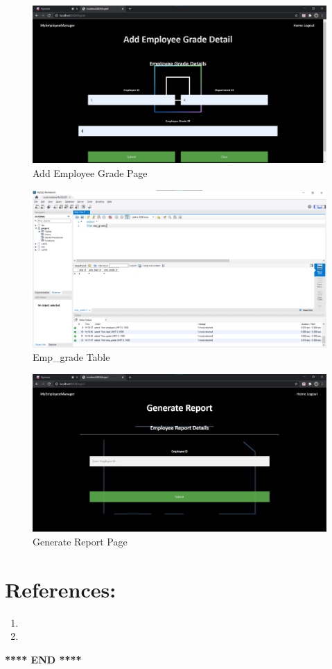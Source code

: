 \documentclass[12pt]{article}
\begin{document}
\begin{figure}
    \centering
    \includegraphics[width = \columnwidth]{screenshots/addempgradepage.png}
    \caption{Add Employee Grade Page}
    \label{fig:my_label}
\end{figure}

\begin{figure}
    \centering
    \includegraphics[width = \columnwidth]{screenshots/addempgradesql.png}
    \caption{Emp\_grade Table}
    \label{fig:my_label}
\end{figure}

\begin{figure}
    \centering
    \includegraphics[width = \columnwidth]{screenshots/generatereportpage.png}
    \caption{Generate Report Page}
    \label{fig:my_label}
\end{figure}

\newpage
\section{References:}
\begin{enumerate}
    \item 
    \item 
\end{enumerate}


\begin{center}
    \textbf{**** END ****}
\end{center}
\end{document}
